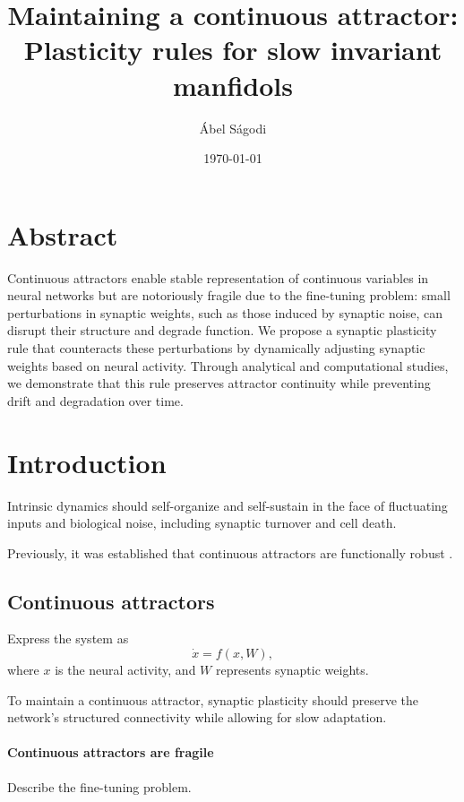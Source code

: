 \documentclass{article}
\title{Maintaining a continuous attractor: Plasticity rules for slow invariant manfidols}
\author{\'Abel S\'agodi}
\date{\today}
\theoremstyle{definition} \newtheorem{definition}{Definition}
\theoremstyle{remark} \newtheorem{remark}{Remark}
\newcounter{ct}
\begin{document}
\maketitle

\section*{Abstract}
Continuous attractors enable stable representation of continuous variables in neural networks but are notoriously fragile due to the fine-tuning problem: small perturbations in synaptic weights, such as those induced by synaptic noise, can disrupt their structure and degrade function.
We propose a synaptic plasticity rule that counteracts these perturbations by dynamically adjusting synaptic weights based on neural activity.
Through analytical and computational studies, we demonstrate that this rule preserves attractor continuity while preventing drift and degradation over time.




\section{Introduction}


Intrinsic dynamics should self-organize and self-sustain in the face of fluctuating inputs and biological noise, including synaptic turnover and cell death.


Previously, it was established that continuous attractors are functionally robust \citep{Sagodi2024a}.



\subsection{Continuous attractors}
Express the system as 
\begin{equation}
\dot x = f(x,W),
\end{equation} where $x$ is the neural activity, and $W$ represents synaptic weights.


To maintain a continuous attractor, synaptic plasticity should preserve the network’s structured connectivity while allowing for slow adaptation.


\paragraph{Continuous attractors are fragile}
Describe the fine-tuning problem.
\end{document}
